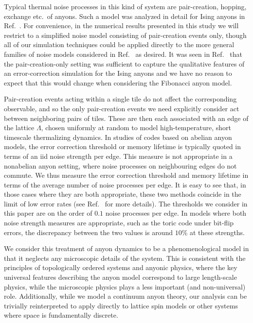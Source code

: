 \documentclass[aps, prl, letterpaper, twocolumn, superscriptaddress, notitlepage, 10pt]{revtex4-1}
\begin{document}
Typical thermal noise processes in this kind of system are 
pair-creation, hopping, exchange etc.~of anyons. Such a model was analyzed in detail for Ising anyons in Ref.~\cite{Brell2013}.
For convenience, in the numerical results presented in this study we will restrict to a simplified noise model consisting of pair-creation events only, though all of our simulation techniques could be applied directly to the more general families of noise models considered in Ref.~\cite{Brell2013} as desired. It was seen in Ref.~\cite{Brell2013} that the pair-creation-only setting was sufficient to capture the qualitative features of an error-correction simulation for the Ising anyons and we have no reason to expect that this would change when considering the Fibonacci anyon model. 

Pair-creation events acting within a single tile do not affect the corresponding observable, and so the only pair-creation events we need explicitly consider act between neighboring pairs of tiles. These are then each associated with an edge of the lattice $\Lambda$, chosen 
uniformly at random to model high-temperature, short timescale thermalizing dynamics.
In studies of codes based on abelian anyon models, the error correction threshold or memory lifetime is typically quoted in terms of an iid noise strength per edge. This measure is not appropriate in a nonabelian anyon setting, where noise processes on neighbouring edges do not commute. We thus measure the error correction threshold and memory lifetime in terms of the average number of noise processes per edge. 
It is easy to see that, in those cases where they are both appropriate, these two methods coincide in the limit of low error rates (see Ref.~\cite{Brell2013} for more details). The thresholds we consider in this paper are on the order of $0.1$ noise processes per edge. In models where both noise strength measures are appropriate, such as the toric code under bit-flip errors, the discrepancy between the two values is around $10\%$ at these strengths.

We consider this treatment of anyon dynamics to be a phenomenological model in that
it neglects any microscopic details of the system.
This is consistent with the principles of topologically 
ordered systems and anyonic physics, where the key universal features describing the 
anyon model correspond to large length-scale physics, while the microscopic physics plays 
a less important (and non-universal) role.
Additionally, while we model a continuum anyon theory, our analysis can be trivially reinterpreted to apply directly to lattice spin models or other systems where space is fundamentally discrete.
\end{document}
